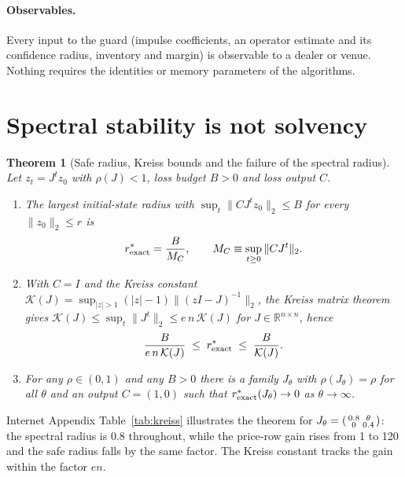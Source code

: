 \documentclass[12pt]{article}
\newtheorem{theorem}{Theorem}[section]
\theoremstyle{definition}
\theoremstyle{remark}
\newcommand{\R}{\mathbb{R}}
\begin{document}
\paragraph{Observables.} Every input to the guard (impulse coefficients, an operator estimate and its confidence radius, inventory and margin) is observable to a dealer or venue. Nothing requires the identities or memory parameters of the algorithms.

\section{Spectral stability is not solvency}\label{sec:radius}

\begin{theorem}[Safe radius, Kreiss bounds and the failure of the spectral radius]\label{thm:radius}
Let $z_t=J^tz_0$ with $\rho(J)<1$, loss budget $B>0$ and loss output $C$.
\begin{enumerate}[label=(\roman*)]
\item The largest initial-state radius with $\sup_t\|CJ^tz_0\|_2\le B$ for every $\|z_0\|_2\le r$ is
\begin{equation}\label{eq:rexact}
r^*_{\rm exact}=\frac{B}{M_C},\qquad M_C\equiv\sup_{t\ge0}\|CJ^t\|_2 .
\end{equation}
\item With $C=I$ and the Kreiss constant $\mathcal K(J)=\sup_{|z|>1}(|z|-1)\|(zI-J)^{-1}\|_2$, the Kreiss matrix theorem gives $\mathcal K(J)\le\sup_t\|J^t\|_2\le e\,n\,\mathcal K(J)$ for $J\in\R^{n\times n}$, hence
\begin{equation}\label{eq:kreiss}
\frac{B}{e\,n\,\mathcal K(J)}\;\le\;r^*_{\rm exact}\;\le\;\frac{B}{\mathcal K(J)} .
\end{equation}
\item For any $\rho\in(0,1)$ and any $B>0$ there is a family $J_\theta$ with $\rho(J_\theta)=\rho$ for all $\theta$ and an output $C=(1,0)$ such that $r^*_{\rm exact}(J_\theta)\to0$ as $\theta\to\infty$.
\end{enumerate}
\end{theorem}

Internet Appendix Table~\ref{tab:kreiss} illustrates the theorem for $J_\theta=\begin{psmallmatrix}0.8&\theta\\0&0.4\end{psmallmatrix}$: the spectral radius is $0.8$ throughout, while the price-row gain rises from 1 to 120 and the safe radius falls by the same factor. The Kreiss constant tracks the gain within the factor $en$.
\end{document}
